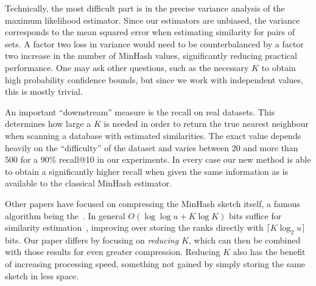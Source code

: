 Technically, the most difficult part is in the precise variance analysis of the maximum likelihood estimator.
Since our estimators are unbiased, the variance corresponds to the mean squared error when estimating similarity for pairs of sets.
A factor two loss in variance would need to be counterbalanced by a factor two increase in the number of MinHash values, significantly reducing practical performance.
One may ask other questions, such as the necessary $K$ to obtain high probability confidence bounds,
but since we work with independent values, this is mostly trivial.

An important ``downstream'' measure is the recall on real datasets.
This determines how large a $K$ is needed in order to return the true nearest neighbour when scanning a database with estimated similarities.
The exact value depends heavily on the ``difficulty'' of the dataset and varies between 20 and more than 500 for a 90\% recall@10 in our experiments.
In every case our new method is able to obtain a significantly higher recall when given the same information as is available to the classical MinHash estimator.

Other papers have focused on compressing the MinHash sketch itself, a famous algorithm being the~\cite{flajolet2007hyperloglog}.
In general $O(\log\log u + K\log K)$ bits suffice for similarity estimation~\cite{DBLP:reference/algo/Cohen16b}, improving over storing the ranks directly with $\lceil K\log_2 u\rceil$ bits.
Our paper differs by focusing on \emph{reducing $K$}, which can then be combined with those results for even greater compression.
Reducing $K$ also has the benefit of increasing processing speed, something not gained by simply storing the same sketch in less space.
